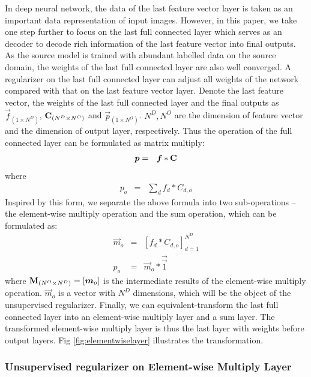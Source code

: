 \documentclass[runningheads]{llncs}
\begin{document}
In deep neural network, the data of the last feature vector layer is taken as an important data representation of input images. However, in this paper, we take one step further to focus on the last full connected layer which serves as an decoder to decode rich information of the last feature vector into final outputs. As the source model is trained with abundant labelled data on the source domain, the weights of the last full connected layer are also well converged. A regularizer on the last full connected layer can adjust all weights of the network compared with that on the last feature vector layer. Denote the last feature vector, the weights of the last full connected layer and the final outputs as $\vec{f}_{(1\times N^{D})}$, ${\bf C}_{(N^{D}\times N^{O})}$ and $\vec{p}_{(1\times N^{O})}$. $ N^{D}, N^{O}$ are the dimension of feature vector and the dimension of output layer, respectively. Thus the operation of the full connected layer can be formulated as matrix multiply:
\begin{eqnarray}
  \vec{p} &=& \vec{f}*{\bf C} \label{eq:matrixmultiply}
\end{eqnarray}
where
\begin{eqnarray}
  p_{o} &=&  \sum_{d}{f_{d}*C_{d,o}}
\end{eqnarray}
Inspired by this form, we separate the above formula into two sub-operations -- the element-wise multiply operation and the sum operation, which can be formulated as:
\begin{eqnarray}
  \vec{m}_{o} &=& [f_{d} * C_{d,o}]^{N^{D}}_{d=1} \label{eq:elementwisemultiply} \\
  p_{o} &=& \vec{m}_{o}*\vec{\overrightarrow{1}}
\end{eqnarray}
where ${\bf M}_{(N^{O}\times N^{D})} = [\vec{m}_{o}]$ is the intermediate results of the element-wise multiply operation. $\vec{m}_{o}$ is a vector with $N^{D}$ dimensions, which will be the object of the unsupervised regularizer. Finally, we can equivalent-transform the last full connected layer into an element-wise multiply layer and a sum layer. The transformed element-wise multiply layer is thus the last layer with weights before output layers. Fig \ref{fig:elementwiselayer} illustrates the transformation.


\subsubsection{Unsupervised regularizer on Element-wise Multiply Layer}
\end{document}
